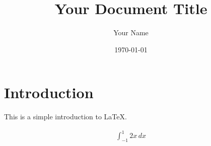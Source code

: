 \documentclass{article}
\title{Your Document Title}
\author{Your Name}
\date{\today}
\begin{document}
\maketitle

\section{Introduction}
This is a simple introduction to LaTeX.

\begin{gather*}
    \int_{-1}^{1} 2x \, dx
\end{gather*}
\end{document}
